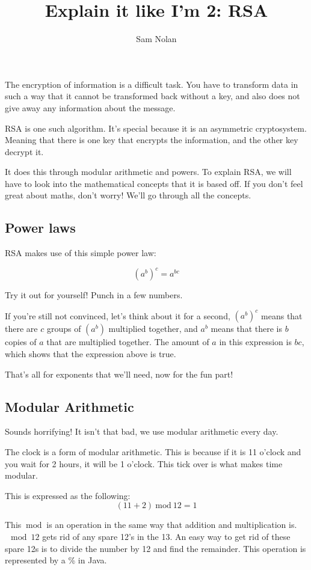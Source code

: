 \documentclass{article}
\author{Sam Nolan}
\title{Explain it like I'm 2: RSA}
\newcommand{\inmod}{\ \text{mod}\ }
\begin{document}
  \maketitle

  The encryption of information is a difficult task. You have to transform data in such a way that it cannot be transformed back without a key, and also does not give away any information about the message.

  RSA is one such algorithm. It's special because it is an asymmetric cryptosystem. Meaning that there is one key that encrypts the information, and the other key decrypt it.
  
  It does this through modular arithmetic and powers. To explain RSA, we will have to look into the mathematical concepts that it is based off. If you don't feel great about maths, don't worry! We'll go through all the concepts.

  \subsection*{Power laws}
  RSA makes use of this simple power law:

  \[ (a^{b})^c = a^{bc} \]

  Try it out for yourself! Punch in a few numbers.

  If you're still not convinced, let's think about it for a second, $(a^b)^c$ means that there are $c$ groups of $(a^b)$ multiplied together, and $a^b$ means that there is $b$ copies of $a$ that are multiplied together. The amount of $a$ in this expression is $bc$, which shows that the expression above is true.

  That's all for exponents that we'll need, now for the fun part!

  \subsection*{Modular Arithmetic}
  Sounds horrifying! It isn't that bad, we use modular arithmetic every day.

  The clock is a form of modular arithmetic. This is because if it is 11 o'clock and you wait for 2 hours, it will be 1 o'clock. This tick over is what makes time modular.

  This is expressed as the following:
  \[ (11 + 2) \inmod 12 = 1 \]

  This $\inmod$ is an operation in the same way that addition and multiplication is. $\mod 12$ gets rid of any spare 12's in the 13. An easy way to get rid of these spare 12s is to divide the number by 12 and find the remainder. This operation is represented by a \% in Java.
\end{document}
